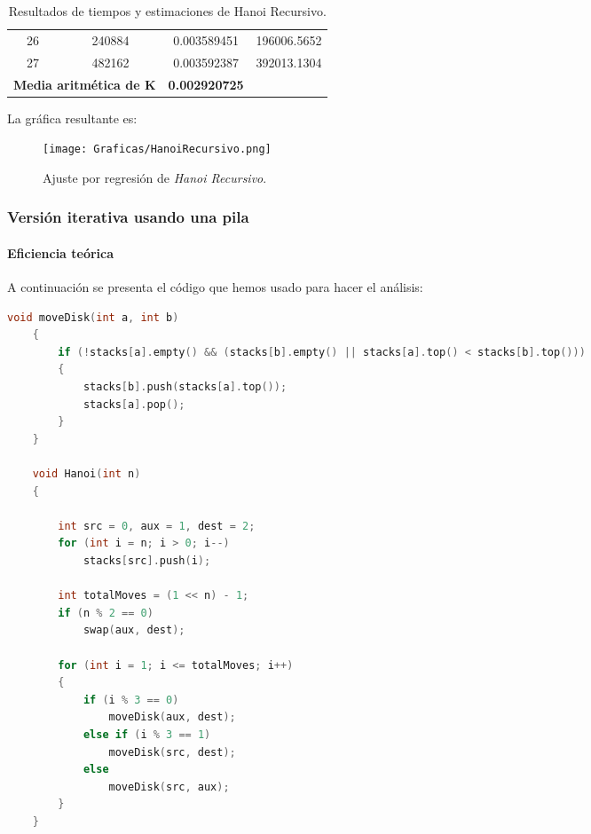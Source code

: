 \documentclass[a4paper,12pt]{article} %
\begin{document}
\begin{table}[H]
{\begin{tabular}{|c|c|c|c|}
			26                                                 & 240884               & 0.003589451                 & 196006.5652                                      \\
			27                                                 & 482162               & 0.003592387                 & 392013.1304                                      \\
			\hline
			\multicolumn{2}{l}{\textbf{Media aritmética de K}} & \textbf{0.002920725}                                                                                  \\
			\hline
		\end{tabular}%
	}
	\caption{Resultados de tiempos y estimaciones de Hanoi Recursivo.}
	\label{tab:resultados}
\end{table}

La gráfica resultante es:
\begin{figure}[H]
	\centering
	\texttt{[image: Graficas/HanoiRecursivo.png]}
	\caption{Ajuste por regresión de \textit{Hanoi Recursivo}.}
\end{figure}


\subsubsection{Versión iterativa usando una pila}

\paragraph{Eficiencia teórica}

A continuación se presenta el código que hemos usado para hacer el análisis:

\begin{lstlisting}[language=C, caption={Código de Hanoi Iterativo con pila}]
	void moveDisk(int a, int b)
	{
		if (!stacks[a].empty() && (stacks[b].empty() || stacks[a].top() < stacks[b].top()))
		{
			stacks[b].push(stacks[a].top());
			stacks[a].pop();
		}
	}
	 
	void Hanoi(int n)
	{
	 
		int src = 0, aux = 1, dest = 2;
		for (int i = n; i > 0; i--)
			stacks[src].push(i);
	 
		int totalMoves = (1 << n) - 1;
		if (n % 2 == 0)
			swap(aux, dest);
	 
		for (int i = 1; i <= totalMoves; i++)
		{
			if (i % 3 == 0)
				moveDisk(aux, dest);
			else if (i % 3 == 1)
				moveDisk(src, dest);
			else
				moveDisk(src, aux);
		}
	}
\end{lstlisting}
\end{document}
